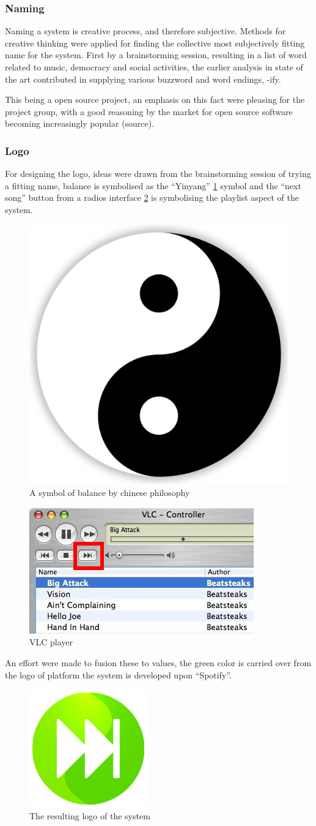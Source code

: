 
\subsubsection{Naming}
Naming a system is creative process, and therefore subjective. Methods for creative thinking were applied for finding the collective most subjectively fitting name for the system. First by a brainstorming session, resulting in a list of word related to music, democracy and social activities, the earlier analysis in state of the art contributed in supplying various buzzword and word endings, -ify.

This being a open source project, an emphasis on this fact were pleasing for the project group, with a good reasoning by the market for open source software becoming increasingly popular (source).

\subsubsection{Logo}
For designing the logo, ideas were drawn from the brainstorming session of trying a fitting name, balance is symbolised as the \enquote{Yinyang} \cref{fig:yinyang} symbol and the \enquote{next song} button from a radios interface \cref{fig:vlc} is symbolising the playlist aspect of the system.

\begin{figure}
  \centering
  \includegraphics[width=0.1\linewidth]{Images/Yin-Yang.png}
  \caption{A symbol of balance by chinese philosophy \cite{yinyangsource} }
  \label{fig:yinyang}
\end{figure}

\begin{figure}
  \centering
  \includegraphics[width=0.3\linewidth]{Images/vlc.jpg}
  \caption{VLC player}
  \label{fig:vlc}
\end{figure}

An effort were made to fusion these to values, the green color is carried over from the logo of platform the system is developed upon \enquote{Spotify}.

\begin{figure}
  \centering
  \includegraphics[width=0.5\linewidth]{Images/Icon.png}
  \caption{The resulting logo of the system}
  \label{fig:logo}
\end{figure}